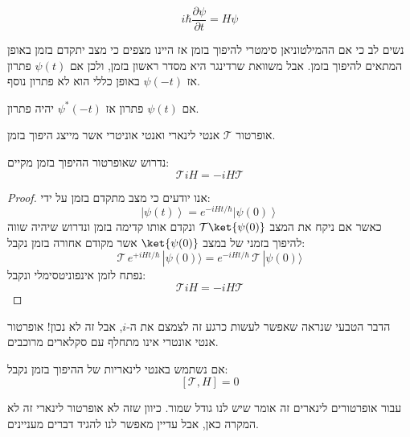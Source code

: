 \documentclass{tstextbook}
\begin{document}
\begin{reminder}
$$i\hbar{\frac{\partial\psi}{\partial t}}=H\psi$$

\end{reminder}
\begin{remark}
נשים לב כי אם ההמילטוניאן סימטרי להיפוך בזמן אז היינו מצפים כי מצב יתקדם בזמן באופן המתאים להיפוך בזמן. אבל משוואת שרדינגר היא מסדר ראשון בזמן, ולכן אם \(\psi(t)\) פתרון אז \(\psi(-t)\) באופן כללי הוא לא פתרון נוסף.

\end{remark}
\begin{proposition}
אם \(\psi(t)\) פתרון אז \(\psi^{*}(-t)\) יהיה פתרון.

\end{proposition}
\begin{definition}
אופרטור \(\mathcal{T}\) אנטי לינארי ואנטי אוניטרי אשר מייצג היפוך בזמן.

\end{definition}
\begin{proposition}
נדרוש שאופרטור ההיפוך בזמן מקיים:
$$\mathcal{T} i H=-i H\mathcal{T}$$

\end{proposition}
\begin{proof}
אנו יודעים כי מצב מתקדם בזמן על ידי:
$$\left|\psi(t)\right\rangle=e^{-i H t/\hbar}\left|\psi(0)\right\rangle$$
כאשר אם ניקח את המצב \(\mathcal{T}\ket{\psi(0)}\) ונקדם אותו קדימה בזמן ונדרוש שיהיה שווה להיפוך בזמני של במצב \(\ket{\psi(0)}\) אשר מקודם אחורה בזמן נקבל:
$$\mathcal{T}\,e^{+i H t/\hbar}\,|\psi(0)\rangle=e^{-i H t/\hbar}\,\mathcal{T}\,|\psi(0)\rangle$$
נפתח לזמן אינפוניטסימלי ונקבל:
$$\mathcal{T} i H=-i H\mathcal{T}$$

\end{proof}
\begin{remark}
הדבר הטבעי שנראה שאפשר לעשות כרגע זה לצמצם את ה-\(i\), אבל זה לא נכון! אופרטור אנטי אונטרי אינו מתחלף עם סקלארים מרוכבים.

\end{remark}
\begin{corollary}
אם נשתמש באנטי לינאריות של ההיפוך בזמן נקבל:
$$[\mathcal{T} ,H]=0$$

\end{corollary}
\begin{remark}
עבור אופרטורים לינארים זה אומר שיש לנו גודל שמור. כיוון שזה לא אופרטור לינארי זה לא המקרה כאן, אבל עדיין מאפשר לנו להגיד דברים מעניינים.

\end{remark}
\end{document}
